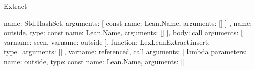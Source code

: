 \begin{lexlean}{Extract}
\begin{toolingmodule}
{{{{{{{{{{{{{{{{{{{{{{                                                              name: Std.HashSet,
                                                              arguments: [
                                                                const{
                                                                  name: Lean.Name,
                                                                  arguments: []
                                                                }
                                                              ]
                                                            }
                                                          },
                                                          {
                                                            name: outside,
                                                            type: const{
                                                              name: Lean.Name,
                                                              arguments: []
                                                            }
                                                          }
                                                        ],
                                                        body: call{
                                                          arguments: [
                                                            var{name: seen},
                                                            var{name: outside}
                                                          ],
                                                          function: LexLeanExtract.insert,
                                                          type_arguments: []
                                                        }
                                                      },
                                                      var{name: referenced},
                                                      call{
                                                        arguments: [
                                                          lambda{
                                                            parameters: [
                                                              {
                                                                name: outside,
                                                                type: const{
                                                                  name: Lean.Name,
                                                                  arguments: []
                                                                }
}}}}}}}}}}}}}}}}}}}}}}
\end{toolingmodule}
\end{lexlean}
